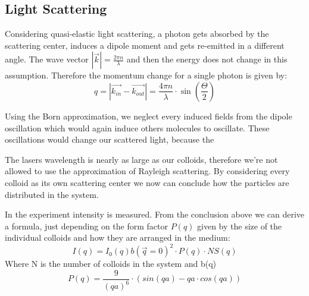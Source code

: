 \documentclass[]{article}
\begin{document}
\subsection{Light Scattering}
Considering quasi-elastic light scattering, a photon gets absorbed by the scattering center, induces a dipole moment and gets re-emitted in a different angle. The wave vector $ |\vec{k}| = \frac{2\pi n}{\lambda}$ and then the energy does not change in this assumption. Therefore the momentum change for a single photon is given by:
\begin{equation}\label{eq:momentum}
q= |\vec{k_{in}} - \vec{k_{out}}| = \frac{4\pi n}{\lambda} \cdot \sin \left( \dfrac{\Theta}{2} \right)  
\end{equation}


Using the Born approximation, we neglect every induced fields from the dipole oscillation which would again induce others molecules to oscillate. These oscillations would change our scattered light, because the  

	
The lasers wavelength is nearly as large as our colloids, therefore we're not allowed to use the approximation of Rayleigh scattering. By considering every colloid as its own scattering center we now can conclude how the particles are distributed in the system.

In the experiment intensity is measured. From the conclusion above we can derive a formula, just depending on the form factor $P(q)$ given by the size of the individual colloids and how they are arranged in the medium:
\begin{equation} \label{eq:intensity}
I(q) = I_0(q)b(\vec{q}=0)^2 \cdot P(q) \cdot NS(q)
\end{equation}
Where N is the number of colloids in the system and b(q) 
\\

\begin{equation}\label{eq:form}
P(q)= \frac{9}{(qa)^6} \cdot (sin(qa) - qa \cdot cos(qa))
\end{equation}
\end{document}
